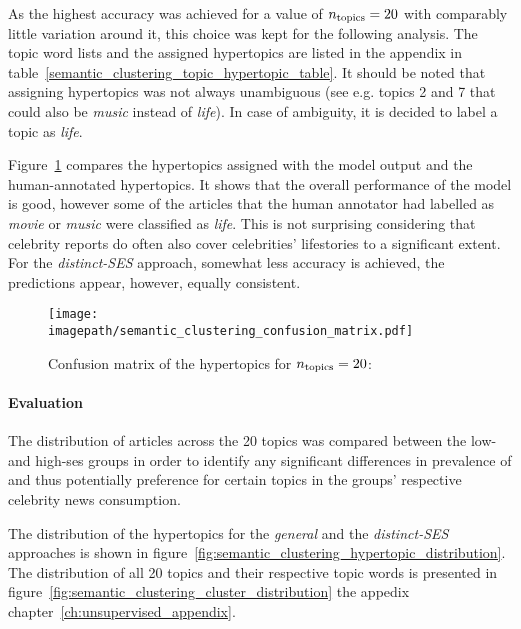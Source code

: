 As the highest accuracy was achieved for a value of $n_\text{topics}=20$ with comparably little variation around it, this choice was kept for the following analysis. The topic word lists and the assigned hypertopics are listed in the appendix in table~\ref{semantic_clustering_topic_hypertopic_table}. It should be noted that assigning hypertopics was not always unambiguous (see e.g. topics 2 and 7 that could also be \textit{music} instead of \textit{life}). In case of ambiguity, it is decided to label a topic as \textit{life}.

Figure~\ref{fig:embedding_confusion_matrix} compares the hypertopics assigned with the model output and the human-annotated hypertopics. It shows that the overall performance of the model is good, however some of the articles that the human annotator had labelled as \textit{movie} or \textit{music} were classified as \textit{life}. This is not surprising considering that celebrity reports do often also cover celebrities' lifestories to a significant extent. For the \textit{distinct-SES} approach, somewhat less accuracy is achieved, the predictions appear, however, equally consistent.

\begin{figure}
    \centering
    \texttt{[image: \\imagepath/semantic\_clustering\_confusion\_matrix.pdf]}
    \caption{Confusion matrix of the hypertopics for $n_\text{topics}=20$:}\label{fig:embedding_confusion_matrix}
\end{figure}

\paragraph{Evaluation}
The distribution of articles across the \SI{20}{} topics was compared between the low- and high-\gls{ses} groups in order to identify any significant differences in prevalence of and thus potentially preference for certain topics in the groups' respective celebrity news consumption.

The distribution of the hypertopics for the \textit{general} and the \textit{distinct-SES} approaches is shown in figure~\ref{fig:semantic_clustering_hypertopic_distribution}. The distribution of all \SI{20}{} topics and their respective topic words is presented in figure~\ref{fig:semantic_clustering_cluster_distribution} the appedix chapter~\ref{ch:unsupervised_appendix}.

